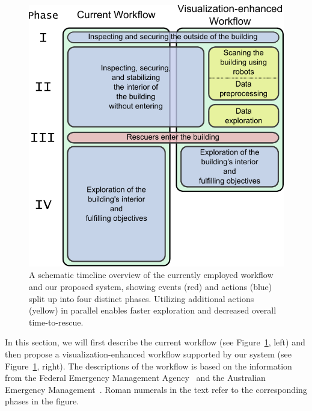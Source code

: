 \documentclass{egpubl}
\begin{document}
\begin{figure}
	\newcommand{\abWorkflowImageHeight}{\columnwidth}
	\centering
	\includegraphics[height=\abWorkflowImageHeight]{figures/workflow.pdf}
	\caption{A schematic timeline overview of the currently employed workflow and our proposed system, showing events (red) and actions (blue) split up into four distinct phases. Utilizing additional actions (yellow) in parallel enables faster exploration and decreased overall time-to-rescue.}
	\label{fig:workflow:workflow}
\end{figure}

In this section, we will first describe the current workflow (see Figure~\ref{fig:workflow:workflow}, left) and then propose a visualization-enhanced workflow supported by our system (see Figure~\ref{fig:workflow:workflow}, right). The descriptions of the workflow is based on the information from the Federal Emergency Management Agency~\cite{fema08} and the Australian Emergency Management~\cite{em35}. Roman numerals in the text refer to the corresponding phases in the figure.
\end{document}
